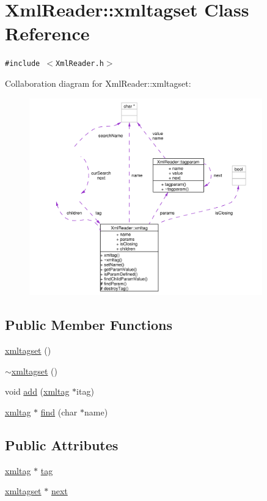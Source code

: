 \hypertarget{classXmlReader_1_1xmltagset}{
\section{Xml\-Reader::xmltagset Class Reference}
\label{classXmlReader_1_1xmltagset}
}
{\tt \#include $<$Xml\-Reader.h$>$}

Collaboration diagram for Xml\-Reader::xmltagset:\begin{figure}[H]
\begin{center}
\leavevmode
\includegraphics[width=286pt]{classXmlReader_1_1xmltagset__coll__graph}
\end{center}
\end{figure}
\subsection*{Public Member Functions}
\begin{CompactItemize}
\item 
\hyperlink{classXmlReader_1_1xmltagset_a0}{xmltagset} ()
\item 
\hyperlink{classXmlReader_1_1xmltagset_a1}{$\sim$xmltagset} ()
\item 
void \hyperlink{classXmlReader_1_1xmltagset_a2}{add} (\hyperlink{classXmlReader_1_1xmltag}{xmltag} $\ast$itag)
\item 
\hyperlink{classXmlReader_1_1xmltag}{xmltag} $\ast$ \hyperlink{classXmlReader_1_1xmltagset_a3}{find} (char $\ast$name)
\end{CompactItemize}
\subsection*{Public Attributes}
\begin{CompactItemize}
\item 
\hyperlink{classXmlReader_1_1xmltag}{xmltag} $\ast$ \hyperlink{classXmlReader_1_1xmltagset_o0}{tag}
\item 
\hyperlink{classXmlReader_1_1xmltagset}{xmltagset} $\ast$ \hyperlink{classXmlReader_1_1xmltagset_o1}{next}
\end{CompactItemize}
